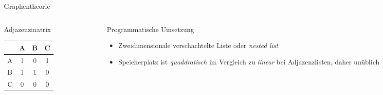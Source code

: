 \documentclass[aspectratio=169]{beamer}
\begin{document}
\begin{frame}{Graphentheorie}
    \vspace{0.5cm}
    \begin{columns}
        \begin{column}{0.5\textwidth}
            \centering \Large Adjazenzmatrix \normalsize
            \begin{table}[]
                \centering
                \begin{tabular}{c|c c c}
                     & A & B & C \\
                     \hline
                    A & 1 & 0 & 1 \\
                    B & 1 & 1 & 0 \\
                    C & 0 & 0 & 0 \\
                \end{tabular}
            \end{table}
        \end{column}
        \begin{column}{0.5\textwidth}
            \centering \Large Programmatische Umsetzung \normalsize
            \begin{itemize}
                \item Zweidimensionale verschachtelte Liste oder \textit{nested list}
                \item Speicherplatz ist \textit{quaddratisch} im Vergleich zu \textit{linear} bei Adjazenzlisten, daher unüblich
            \end{itemize}
        \end{column}
    \end{columns}
\end{frame}
\end{document}
